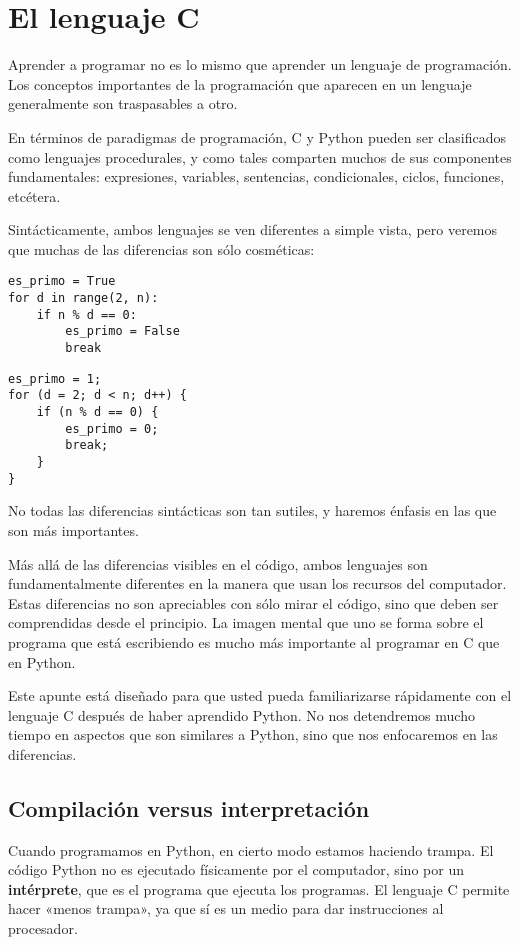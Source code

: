 \chapter{El lenguaje C}

Aprender a programar no es lo mismo que aprender un lenguaje de
programación. Los conceptos importantes de la programación que aparecen
en un lenguaje generalmente son traspasables a otro.

En términos de paradigmas de programación, C y Python pueden ser
clasificados como lenguajes procedurales, y como tales comparten muchos
de sus componentes fundamentales: expresiones, variables, sentencias,
condicionales, ciclos, funciones, etcétera.

Sintácticamente, ambos lenguajes se ven diferentes a simple vista, pero
veremos que muchas de las diferencias son sólo cosméticas:

\begin{lstlisting}
es_primo = True
for d in range(2, n):
    if n % d == 0:
        es_primo = False
        break
\end{lstlisting}

\begin{lstlisting}
es_primo = 1;
for (d = 2; d < n; d++) {
    if (n % d == 0) {
        es_primo = 0;
        break;
    }
}
\end{lstlisting}

No todas las diferencias sintácticas son tan sutiles, y haremos énfasis
en las que son más importantes.

Más allá de las diferencias visibles en el código, ambos lenguajes son
fundamentalmente diferentes en la manera que usan los recursos del
computador. Estas diferencias no son apreciables con sólo mirar el
código, sino que deben ser comprendidas desde el principio. La imagen
mental que uno se forma sobre el programa que está escribiendo es mucho
más importante al programar en C que en Python.

Este apunte está diseñado para que usted pueda familiarizarse
rápidamente con el lenguaje C después de haber aprendido Python. No nos
detendremos mucho tiempo en aspectos que son similares a Python, sino
que nos enfocaremos en las diferencias.

\section{Compilación versus interpretación}

Cuando programamos en Python, en cierto modo estamos haciendo trampa. El
código Python no es ejecutado físicamente por el computador, sino por un
\textbf{intérprete}, que es el programa que ejecuta los programas. El
lenguaje C permite hacer «menos trampa», ya que sí es un medio para dar
instrucciones al procesador.

